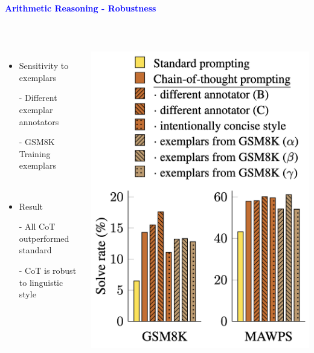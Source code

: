 \documentclass[professionalfont]{beamer}
\begin{document}
\begin{frame}
\begin{center}
    { \textbf{\textcolor{blue}{ {\fontsize{12}{14}\selectfont Arithmetic Reasoning - Robustness} }} }
\end{center}
\\[0.3cm]

\begin{columns}
    {\fontsize{10}{14}\selectfont 
    \begin{itemize}
        \item Sensitivity to exemplars

        - Different exemplar annotators

        - GSM8K Training exemplars

        \\[0.7cm]

        \item Result

        - All CoT outperformed standard

        - CoT is robust to linguistic style
    \end{itemize}
    }
    \includegraphics[width=0.9\linewidth]{figure6.png}
\end{columns}

\end{frame}
\end{document}
